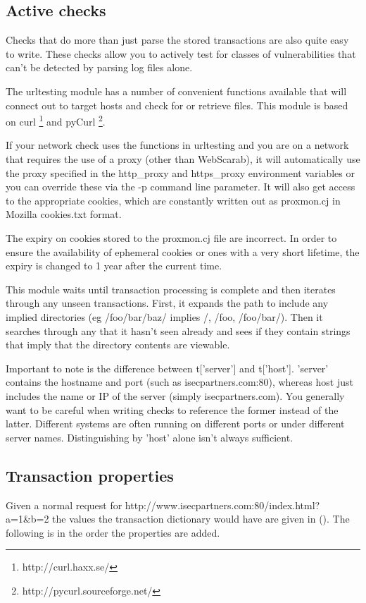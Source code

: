 \documentclass{article}
\begin{document}
\subsection{Active checks}
Checks that do more than just parse the stored transactions are also quite easy
to write.  These checks allow you to actively test for classes of vulnerabilities
that can't be detected by parsing log files alone.

The urltesting module has a number of convenient functions available
that will connect out to target hosts and check for or retrieve files.  This
module is based on curl \footnote{http://curl.haxx.se/} and pyCurl
\footnote{http://pycurl.sourceforge.net/}.

If your network check uses the functions in urltesting and you are on a network that 
requires the use of a proxy (other than WebScarab), it will automatically use the
proxy specified in the http\_proxy and https\_proxy environment variables
or you can override these via the -p command line parameter.  It will also get 
access to the appropriate cookies, which are constantly written out as
proxmon.cj in Mozilla cookies.txt format.

The expiry on cookies stored to the proxmon.cj file are incorrect.  In order
to ensure the availability of ephemeral cookies or ones with a very short
lifetime, the expiry is changed to 1 year after the current time.



This module waits until transaction processing is complete and then iterates
through any unseen transactions.  First, it expands the path to include any
implied directories (eg /foo/bar/baz/ implies /, /foo, /foo/bar/).  Then
it searches through any that it hasn't seen already and sees if they contain
strings that imply that the directory contents are viewable.

Important to note is the difference between t['server'] and t['host'].
'server' contains the hostname and port (such as isecpartners.com:80), whereas 
host just includes the name or IP of the server (simply isecpartners.com).  You 
generally want to be careful when writing checks to reference
the former instead of the latter.  Different systems are often running on 
different ports or under different server names.  Distinguishing by 'host'
alone isn't always sufficient.

\subsection{Transaction properties}
Given a normal request for http://www.isecpartners.com:80/index.html?a=1\&b=2 the values
the transaction dictionary would have are given in ().  The following is in the order the
properties are added.
\end{document}
